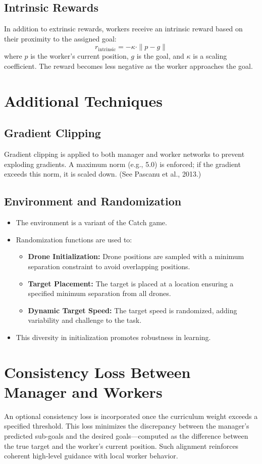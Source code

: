 \documentclass{article}
\begin{document}
\subsection{Intrinsic Rewards}
In addition to extrinsic rewards, workers receive an intrinsic reward based on their proximity to the assigned goal:
\[
r_{\text{intrinsic}} = -\kappa \cdot \| p - g \|
\]
where \( p \) is the worker's current position, \( g \) is the goal, and \( \kappa \) is a scaling coefficient. The reward becomes less negative as the worker approaches the goal.

\section{Additional Techniques}

\subsection{Gradient Clipping}
Gradient clipping is applied to both manager and worker networks to prevent exploding gradients. A maximum norm (e.g., 5.0) is enforced; if the gradient exceeds this norm, it is scaled down. (See Pascanu et al., 2013.)

\subsection{Environment and Randomization}
\begin{itemize}
    \item The environment is a variant of the Catch game.
    \item Randomization functions are used to:
    \begin{itemize}
        \item \textbf{Drone Initialization:} Drone positions are sampled with a minimum separation constraint to avoid overlapping positions.
        \item \textbf{Target Placement:} The target is placed at a location ensuring a specified minimum separation from all drones.
        \item \textbf{Dynamic Target Speed:} The target speed is randomized, adding variability and challenge to the task.
    \end{itemize}
    \item This diversity in initialization promotes robustness in learning.
\end{itemize}

\section{Consistency Loss Between Manager and Workers}
An optional consistency loss is incorporated once the curriculum weight exceeds a specified threshold. This loss minimizes the discrepancy between the manager's predicted sub-goals and the desired goals—computed as the difference between the true target and the worker's current position. Such alignment reinforces coherent high-level guidance with local worker behavior.
\end{document}
